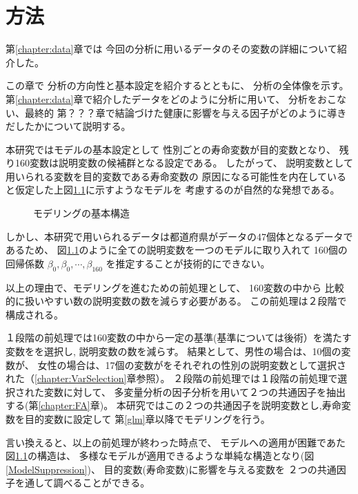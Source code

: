 


\chapter{方法}\label{chapter:methods}


第\ref{chapter:data}章では
今回の分析に用いるデータのその変数の詳細について紹介した。

この章で
分析の方向性と基本設定を紹介するとともに、
分析の全体像を示す。
第\ref{chapter:data}章で紹介したデータをどのように分析に用いて、
分析をおこない、最終的
第？？？章で結論づけた健康に影響を与える因子がどのように導きだしたかについて説明する。

本研究ではモデルの基本設定として
性別ごとの寿命変数が目的変数となり、
残り160変数は説明変数の候補群となる設定である。
したがって、
説明変数として用いられる変数を目的変数である寿命変数の
原因になる可能性を内在していると仮定した上図\ref{ModelStructure}に示すようなモデルを
考慮するのが自然的な発想である。


\begin{figure}[H]
	\caption{モデリングの基本構造}
	\label{ModelStructure}
\end{figure}



しかし、本研究で用いられるデータは都道府県がデータの47個体となるデータであるため、
図\ref{ModelStructure}のように全ての説明変数を一つのモデルに取り入れて
160個の回帰係数
$\beta_0 ,\beta_0 ,\cdots , \beta_{160}$
を推定することが技術的にできない。

以上の理由で、モデリングを進むための前処理として、
160変数の中から
比較的に扱いやすい数の説明変数の数を減らす必要がある。
この前処理は２段階で構成される。

１段階の前処理では160変数の中から一定の基準(基準については後術）を満たす変数をを選択し, 説明変数の数を減らす。
結果として、男性の場合は、10個の変数が、
女性の場合は、17個の変数がをそれぞれの性別の説明変数として選択された（\ref{chapter:VarSelection}章参照）。
２段階の前処理では１段階の前処理で選択された変数に対して、
多変量分析の因子分析を用いて２つの共通因子を抽出する(第\ref{chapter:FA}章)。
本研究ではこの２つの共通因子を説明変数とし,寿命変数を目的変数に設定して
第\ref{glm}章以降でモデリングを行う。

言い換えると、以上の前処理が終わった時点で、
モデルへの適用が困難であた
図\ref{ModelStructure}の構造は、
多様なモデルが適用できるような単純な構造となり(図\ref{ModelSuppression})、
目的変数(寿命変数)に影響を与える変数を
２つの共通因子を通して調べることができる。

